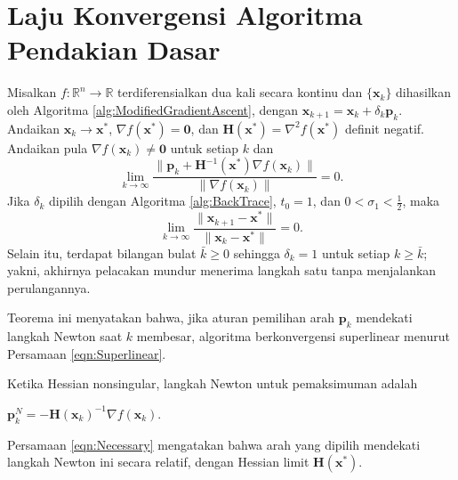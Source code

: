 \section{Laju Konvergensi Algoritma Pendakian Dasar}
\begin{theorem}
\label{thm:Superlinear}
Misalkan $f:\mathbb{R}^n\rightarrow\mathbb{R}$ terdiferensialkan dua kali secara kontinu dan $\{\mathbf{x}_k\}$ dihasilkan oleh Algoritma \ref{alg:ModifiedGradientAscent}, dengan $\mathbf{x}_{k+1}=\mathbf{x}_k+\delta_k\mathbf{p}_k$. Andaikan $\mathbf{x}_k\to\mathbf{x}^*$, $\nabla f(\mathbf{x}^*)=\mathbf{0}$, dan $\mathbf{H}(\mathbf{x}^*)=\nabla^2f(\mathbf{x}^*)$ definit negatif. Andaikan pula $\nabla f(\mathbf{x}_k)\neq\mathbf{0}$ untuk setiap $k$ dan
\begin{equation}
\lim_{k\to\infty}
\frac{\lVert\mathbf{p}_k+\mathbf{H}^{-1}(\mathbf{x}^*)\nabla f(\mathbf{x}_k)\rVert}
{\lVert\nabla f(\mathbf{x}_k)\rVert}=0.
\label{eqn:Necessary}
\end{equation}
Jika $\delta_k$ dipilih dengan Algoritma \ref{alg:BackTrace}, $t_0=1$, dan $0<\sigma_1<\tfrac12$, maka
\begin{equation}
\lim_{k\to\infty}
\frac{\lVert\mathbf{x}_{k+1}-\mathbf{x}^*\rVert}
{\lVert\mathbf{x}_k-\mathbf{x}^*\rVert}=0.
\label{eqn:Superlinear}
\end{equation}
Selain itu, terdapat bilangan bulat $\bar{k}\geq0$ sehingga $\delta_k=1$ untuk setiap $k\geq\bar{k}$; yakni, akhirnya pelacakan mundur menerima langkah satu tanpa menjalankan perulangannya.
\end{theorem}

\begin{remark} Teorema ini menyatakan bahwa, jika aturan pemilihan arah $\mathbf{p}_k$ mendekati langkah Newton saat $k$ membesar, algoritma berkonvergensi superlinear menurut Persamaan \ref{eqn:Superlinear}.
\end{remark}

\begin{remark} Ketika Hessian nonsingular, langkah Newton untuk pemaksimuman adalah

$\mathbf{p}_k^{N}=-\mathbf{H}(\mathbf{x}_k)^{-1}\nabla f(\mathbf{x}_k)$.

Persamaan \ref{eqn:Necessary} mengatakan bahwa arah yang dipilih mendekati langkah Newton ini secara relatif, dengan Hessian limit $\mathbf{H}(\mathbf{x}^*)$.
\end{remark}


